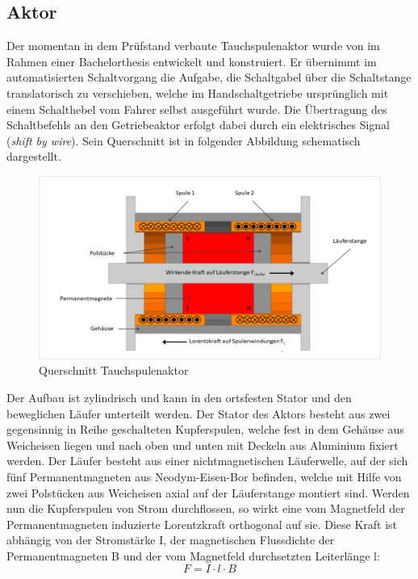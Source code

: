 \subsection{Aktor}

Der momentan in dem Prüfstand verbaute Tauchspulenaktor wurde von \cite{Hahn2018} im Rahmen einer Bachelorthesis entwickelt und konstruiert. Er übernimmt im automatisierten Schaltvorgang die Aufgabe, die Schaltgabel  über die Schaltstange translatorisch zu verschieben, welche im Handschaltgetriebe ursprünglich mit einem Schalthebel vom Fahrer selbst ausgeführt wurde. Die Übertragung des Schaltbefehls an den Getriebeaktor erfolgt dabei durch ein elektrisches Signal (\textit{shift by wire}).
Sein Querschnitt ist in folgender Abbildung schematisch dargestellt.

\begin{figure}[h]
	\centering
		\includegraphics[width=0.9\columnwidth]{Bilder/QuerschnittAktordo.pdf}
	\caption{Querschnitt Tauchspulenaktor \cite[S.30]{Hahn2018}}
	\label{fig:Querschnitt Aktor}
\end{figure} \noindent
Der Aufbau ist zylindrisch und kann in den ortsfesten Stator und den beweglichen Läufer unterteilt werden. Der Stator des Aktors besteht aus zwei gegensinnig in Reihe geschalteten Kupferspulen, welche fest in dem Gehäuse aus Weicheisen liegen und nach oben und unten mit Deckeln aus Aluminium fixiert werden. Der Läufer besteht aus einer nichtmagnetischen Läuferwelle, auf der sich fünf Permanentmagneten aus Neodym-Eisen-Bor befinden, welche mit Hilfe von zwei Polstücken aus Weicheisen axial auf der Läuferstange montiert sind. 
Werden nun die Kupferspulen von Strom durchflossen, so wirkt eine vom Magnetfeld der Permanentmagneten induzierte Lorentzkraft orthogonal auf sie. Diese Kraft ist abhängig von der Stromstärke I, der magnetischen Flussdichte der Permanentmagneten B und der vom Magnetfeld durchsetzten Leiterlänge l:
\begin{equation}\label{eq:lorentz}
F=I\cdot l\cdot B
\end{equation}
